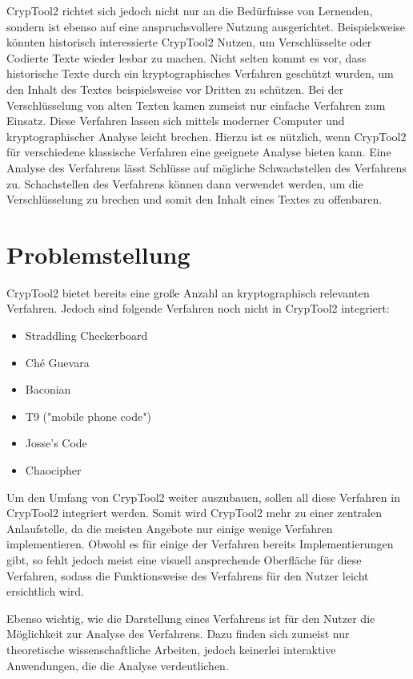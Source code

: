 \documentclass[fontsize=11pt, paper=a4, parskip=half]{scrartcl}
\begin{document}
CrypTool2 richtet sich jedoch nicht nur an die Bedürfnisse von Lernenden, sondern ist ebenso auf eine anspruchsvollere Nutzung ausgerichtet. Beispielsweise könnten historisch interessierte CrypTool2 Nutzen, um Verschlüsselte oder Codierte Texte wieder lesbar zu machen. Nicht selten kommt es vor, dass historische Texte durch ein kryptographisches Verfahren geschützt wurden, um den Inhalt des Textes beispielsweise vor Dritten zu schützen. Bei der Verschlüsselung von alten Texten kamen zumeist nur einfache Verfahren zum Einsatz. Diese Verfahren lassen sich mittels moderner Computer und kryptographischer Analyse leicht brechen. Hierzu ist es nützlich, wenn CrypTool2 für verschiedene klassische Verfahren eine geeignete Analyse bieten kann. Eine Analyse des Verfahrens lässt Schlüsse auf mögliche Schwachstellen des Verfahrens zu. Schachstellen des Verfahrens können dann verwendet werden, um die Verschlüsselung zu brechen und somit den Inhalt eines Textes zu offenbaren.

\section{Problemstellung}
CrypTool2 bietet bereits eine große Anzahl an kryptographisch relevanten Verfahren. Jedoch sind folgende Verfahren noch nicht in CrypTool2 integriert:
\begin{itemize}
	\item{Straddling Checkerboard} 
	\item{Ché Guevara}
	\item{Baconian} 
	\item{T9 ("mobile phone code")}
	\item{Josse's Code}
	\item{Chaocipher} 
\end{itemize}

Um den Umfang von CrypTool2 weiter auszubauen, sollen all diese Verfahren in CrypTool2 integriert werden. Somit wird CrypTool2 mehr zu einer zentralen Anlaufstelle, da die meisten Angebote nur einige wenige Verfahren implementieren. Obwohl es für einige der Verfahren bereits Implementierungen gibt, so fehlt jedoch meist eine visuell ansprechende Oberfläche für diese Verfahren, sodass die Funktionsweise des Verfahrens für den Nutzer leicht ersichtlich wird.

Ebenso wichtig, wie die Darstellung eines Verfahrens ist für den Nutzer die Möglichkeit zur Analyse des Verfahrens. Dazu finden sich zumeist nur theoretische wissenschaftliche Arbeiten, jedoch keinerlei interaktive Anwendungen, die die Analyse verdeutlichen.
\end{document}
